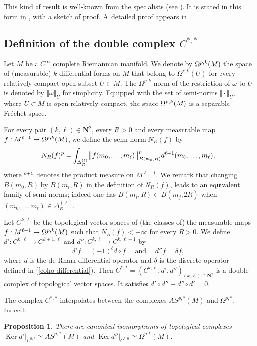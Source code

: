 \documentclass[JEP,XML,SOM,Unicode,published]{cedram}
\newcommand{\NoChangel}[1]{%
\expandafter\let\csname old\string#1\endcsname=#1
\let#1=\relax
\newcommand{#1}{\mathcode`l="716C\csname old\string#1\endcsname\mathcode`l="7160 }%
}
\newcommand{\loc}{\mathrm{loc}}\NoChangel{\loc}
\newcommand{\NN}{\mathbf{N}}
\theoremstyle{plain}
\newtheorem{proposition}[equation]{Proposition}
\theoremstyle{remark}
\theoremstyle{definition}
\DeclareMathOperator{\Ker}{Ker}
\DeclareMathOperator{\vol}{vol}\NoChangel{\vol}
\newcommand{\restr}{\big|}
\begin{document}
This kind of result is well-known from the specialists (see \eg  \cite[Prop.\,9.5 \& Rem.\,p.\,104]{BT82}).
It is stated in this form in \cite[Lem.\,5]{Pa95}, with a sketch of proof.
A~detailed proof appears in \cite[Lem.\,2.2.1]{Sequeira}.

\subsection{Definition of the double complex $C^{*,*}$}

Let $M$ be a $C^\infty$ complete Riemannian manifold. We denote by $\Omega^{p,k}_{\loc}(M)$ the space of (measurable) $k$-differential forms on $M$
that belong to $\Omega^{p,k} (U)$ for every relatively compact open subset $U \subset M$.
The $\Omega^{p,k}$-norm of the restriction of $\omega$ to $U$ is denoted by $\Vert \omega \Vert_{U}$ for simplicity.
Equipped with the set of semi-norms $\Vert {\cdot} \Vert_{U}$, where $U \subset M$ is open relatively compact,
the space $\Omega^{p,k}_{\loc}(M)$
is a separable Fréchet space.

For every pair $(k, \ell) \in \NN^2$, every $R>0$ and every measurable map $f: M^{\ell +1} \to \Omega^{p,k}_{\loc}(M)$,
we define the semi-norm $N_R (f)$ by
\[N_R (f)^p = \int_{\Delta_R^{(\ell)}} \bigl\Vert f(m_0,\dots , m_{\ell}) \bigr\Vert_{B(m_0,R)}^p
d\vol^{\ell +1}(m_0,\dots , m_{\ell}),\]
where $\vol^{\ell +1}$ denotes the product measure on $M^{\ell +1}$. We remark that changing $B(m_0, R)$ by $B(m_i,R)$
in the definition of $N_R(f)$, leads to an equivalent family of semi-norms; indeed one has $B(m_i,R) \subset B(m_j, 2R)$
when $(m_0, \dots, m_{\ell}) \in \Delta_R^{(\ell)}$.

Let $C^{k, \ell}$ be the topological vector spaces of (the classes of) the measurable maps
$f: M^{\ell +1} \to \Omega^{p,k}_{\loc}(M)$
such that $N_R (f) < +\infty$ for every $R>0$.
We define $d': C^{k, \ell} \to C^{k+1, \ell}$ and $d'': C^{k, \ell} \to C^{k, \ell +1}$ by
\[d'f = (-1)^\ell d \circ f ~~~\text{~~and~~}~~~ d''f = \delta f,\]
where $d$ is the de Rham differential operator and $\delta$ is the discrete operator defined in (\ref{coho-differential}).
Then $C^{*,*} = (C^{k, \ell}, d', d'')_{(k, \ell) \in \NN^2}$ is a double complex of topological vector spaces.
It satisfies $d' \circ d'' + d'' \circ d' =0$.

The complex $C^{*,*}$ interpolates between the complexes $AS^{p,*}(M)$ and $\Omega^{p, *}$. Indeed:
\begin{proposition}\label{appendix-proposition1}
There are canonical isomorphisms of topological complexes
$\Ker d' \restr_{C^{0, *}} \simeq AS^{p, *}(M)$ and $\Ker d'' \restr_{C^{*, 0}} \simeq \Omega^{p, *}(M)$.
\end{proposition}
\end{document}
